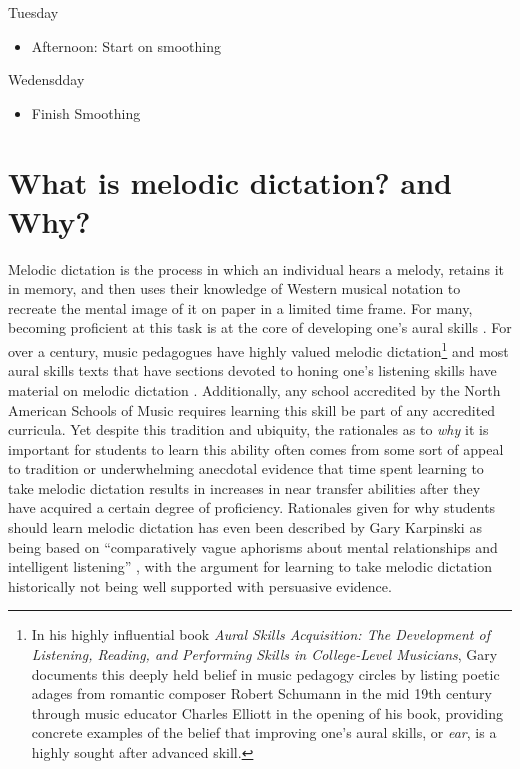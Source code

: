 \documentclass[]{book}
\providecommand{\tightlist}{%
  \setlength{\itemsep}{0pt}\setlength{\parskip}{0pt}}
\let\rmarkdownfootnote\footnote%
\def\footnote{\protect\rmarkdownfootnote}
\theoremstyle{definition}
\theoremstyle{definition}
\theoremstyle{definition}
\theoremstyle{remark}
\begin{document}
Tuesday

\begin{itemize}
\tightlist
\item
  Afternoon: Start on smoothing
\end{itemize}

Wedensdday

\begin{itemize}
\tightlist
\item
  Finish Smoothing
\end{itemize}

\hypertarget{what-is-melodic-dictation-and-why}{%
\section{What is melodic dictation? and
Why?}\label{what-is-melodic-dictation-and-why}}

Melodic dictation is the process in which an individual hears a melody,
retains it in memory, and then uses their knowledge of Western musical
notation to recreate the mental image of it on paper in a limited time
frame. For many, becoming proficient at this task is at the core of
developing one's aural skills \citep{karpinskiModelMusicPerception1990}.
For over a century, music pedagogues have highly valued melodic
dictation\footnote{In his highly influential book \emph{Aural Skills
  Acquisition: The Development of Listening, Reading, and Performing
  Skills in College-Level Musicians}, Gary
  \citet{karpinskiAuralSkillsAcquisition2000} documents this deeply held
  belief in music pedagogy circles by listing poetic adages from
  romantic composer Robert Schumann in the mid 19th century through
  music educator Charles Elliott in the opening of his book, providing
  concrete examples of the belief that improving one's aural skills, or
  \emph{ear}, is a highly sought after advanced skill. } and most aural
skills texts that have sections devoted to honing one's listening skills
have material on melodic dictation
\citep{karpinskiAuralSkillsAcquisition2000}. Additionally, any school
accredited by the North American Schools of Music requires learning this
skill be part of any accredited curricula. Yet despite this tradition
and ubiquity, the rationales as to \emph{why} it is important for
students to learn this ability often comes from some sort of appeal to
tradition or underwhelming anecdotal evidence that time spent learning
to take melodic dictation results in increases in near transfer
abilities after they have acquired a certain degree of proficiency.
Rationales given for why students should learn melodic dictation has
even been described by Gary Karpinski as being based on ``comparatively
vague aphorisms about mental relationships and intelligent listening''
\citep[p.192]{karpinskiModelMusicPerception1990}, with the argument for
learning to take melodic dictation historically not being well supported
with persuasive evidence.
\end{document}
